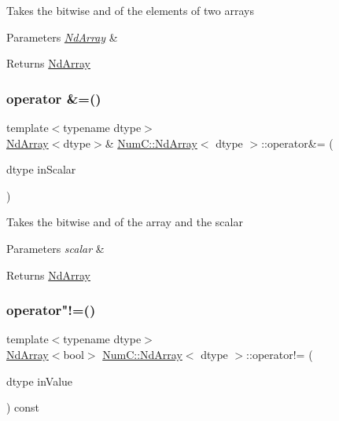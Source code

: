 Takes the bitwise and of the elements of two arrays


\begin{DoxyParams}{Parameters}
{\em \mbox{\hyperlink{class_num_c_1_1_nd_array}{Nd\+Array}}} & \\
\hline
\end{DoxyParams}
\begin{DoxyReturn}{Returns}
\mbox{\hyperlink{class_num_c_1_1_nd_array}{Nd\+Array}} 
\end{DoxyReturn}
\mbox{\label{class_num_c_1_1_nd_array_aa7d1db0e3ce1e1ac3697bde5bb61dbd5}} 
\subsubsection{\texorpdfstring{operator \&=()}{operator \&=()}\hspace{0.1cm}{\footnotesize\ttfamily [2/2]}}
{\footnotesize\ttfamily template$<$typename dtype$>$ \\
\mbox{\hyperlink{class_num_c_1_1_nd_array}{Nd\+Array}}$<$dtype$>$\& \mbox{\hyperlink{class_num_c_1_1_nd_array}{Num\+C\+::\+Nd\+Array}}$<$ dtype $>$\+::operator\&= (\begin{DoxyParamCaption}\item[{dtype}]{in\+Scalar }\end{DoxyParamCaption})\hspace{0.3cm}{\ttfamily [inline]}}

Takes the bitwise and of the array and the scalar


\begin{DoxyParams}{Parameters}
{\em scalar} & \\
\hline
\end{DoxyParams}
\begin{DoxyReturn}{Returns}
\mbox{\hyperlink{class_num_c_1_1_nd_array}{Nd\+Array}} 
\end{DoxyReturn}
\mbox{\label{class_num_c_1_1_nd_array_a5fb9a63456f79ce2e828d4228f66de5a}} 
\subsubsection{\texorpdfstring{operator"!=()}{operator!=()}\hspace{0.1cm}{\footnotesize\ttfamily [1/2]}}
{\footnotesize\ttfamily template$<$typename dtype$>$ \\
\mbox{\hyperlink{class_num_c_1_1_nd_array}{Nd\+Array}}$<$bool$>$ \mbox{\hyperlink{class_num_c_1_1_nd_array}{Num\+C\+::\+Nd\+Array}}$<$ dtype $>$\+::operator!= (\begin{DoxyParamCaption}\item[{dtype}]{in\+Value }\end{DoxyParamCaption}) const\hspace{0.3cm}{\ttfamily [inline]}}

